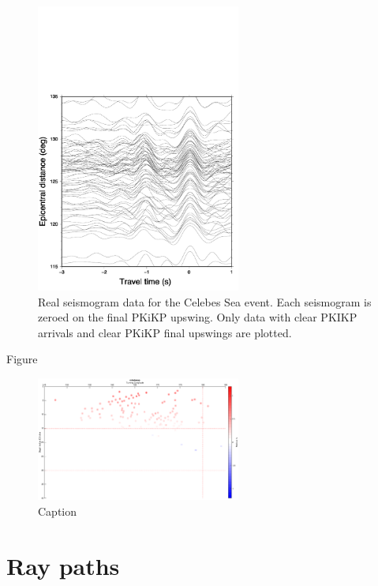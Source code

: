 \documentclass[11pt,a4paper]{article}
\begin{document}
\begin{figure}
	\centering
	\includegraphics[width=0.6\textwidth]{figures/celebessea/celebessea_real_aligned.pdf}
	\caption{Real seismogram data for the Celebes Sea event. Each seismogram is zeroed on the final PKiKP upswing. Only data with clear PKIKP arrivals and clear PKiKP final upswings are plotted.}
	\label{fig:Real aligned}
\end{figure}

Figure 
\begin{figure}
	\centering
	\includegraphics[width=0.6\textwidth]{figures/mindanao/mindanao_longitude}
	\caption{Caption}
\end{figure}


\appendix
\section{Ray paths}
\newpage


\end{document}
